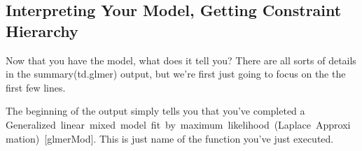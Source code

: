 \documentclass[
  10pt,
  letterpaper]{article}
\renewcommand\texttt[1]{{\ttfamily\color{BrickRed}#1}}
\begin{document}
\hypertarget{interpreting-your-model-getting-constraint-hierarchy}{%
\subsection{Interpreting Your Model, Getting Constraint
Hierarchy}\label{interpreting-your-model-getting-constraint-hierarchy}}

Now that you have the model, what does it tell you? There are all sorts
of details in the \texttt{summary(td.glmer)} output, but we're first
just going to focus on the the first few lines.

The beginning of the output simply tells you that you've completed a
\texttt{Generalized\ linear\ mixed\ model\ fit\ by\ maximum\ likelihood\ (Laplace\ Approximation)\ {[}glmerMod{]}}.
This is just name of the function you've just executed.
\end{document}
